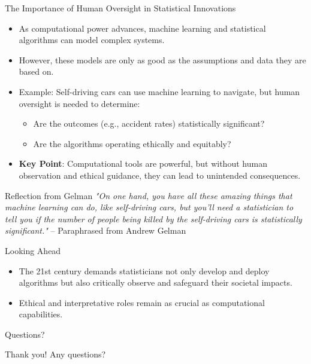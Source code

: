 \documentclass{beamer}
\begin{document}
\begin{frame}{The Importance of Human Oversight in Statistical Innovations}
\begin{itemize}
    \item As computational power advances, machine learning and statistical algorithms can model complex systems.
    \item However, these models are only as good as the assumptions and data they are based on.
    \item Example: Self-driving cars can use machine learning to navigate, but human oversight is needed to determine:
    \begin{itemize}
        \item Are the outcomes (e.g., accident rates) statistically significant?
        \item Are the algorithms operating ethically and equitably?
    \end{itemize}
    \item \textbf{Key Point}: Computational tools are powerful, but without human observation and ethical guidance, they can lead to unintended consequences.
\end{itemize}

\begin{block}{Reflection from Gelman}
\textit{"On one hand, you have all these amazing things that machine learning can do, like self-driving cars, but you'll need a statistician to tell you if the number of people being killed by the self-driving cars is statistically significant."} – Paraphrased from Andrew Gelman
\end{block}

\begin{block}{Looking Ahead}
\begin{itemize}
    \item The 21st century demands statisticians not only develop and deploy algorithms but also critically observe and safeguard their societal impacts.
    \item Ethical and interpretative roles remain as crucial as computational capabilities.
\end{itemize}
\end{block}
\end{frame}


\begin{frame}{Questions?}
\begin{center}
    Thank you! Any questions?
\end{center}
\end{frame}
\end{document}
